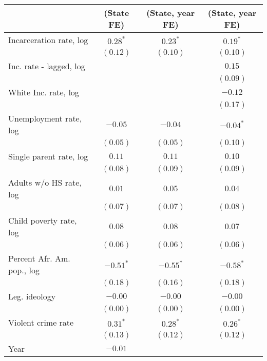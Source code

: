 
\begin{table}
\begin{center}
\label{CL-AfrAm}
\begin{tabular}{l c c c}
\hline
&(State FE)&(State, year FE)&(State, year FE)\\
\hline
Incarceration rate, log     & $0.28^{*}$  &$0.23^{*}$      &$0.19^{*}$ \\
                            & $(0.12)$    & $(0.10)$       &$(0.10)$\\
Inc. rate - lagged, log     &             &                &$0.15$\\
                            &             &                &$(0.09)$\\
White Inc. rate, log        &             &                &$-0.12$\\
                            &             &                &$(0.17)$\\
Unemployment rate, log      & $-0.05$     &$-0.04$     &$-0.04^{*}$\\
                            & $(0.05)$    & $(0.05)$       &$(0.10)$\\
Single parent rate, log     & $0.11$      & $0.11$         &$0.10$\\
                            & $(0.08)$    & $(0.09)$       &$(0.09)$\\
Adults w/o HS rate, log     & $0.01$      & $0.05$         &$0.04$\\
                            & $(0.07)$    & $(0.07)$       &$(0.08)$\\
Child poverty rate, log     & $0.08$      &  $0.08$       &$0.07$\\
                            & $(0.06)$    &  $(0.06)$        &$(0.06)$\\
Percent Afr. Am. pop., log  & $-0.51^{*}$ & $-0.55^{*}$         &$-0.58^{*}$\\
                            & $(0.18)$    & $(0.16)$       &$(0.18)$\\
Leg. ideology               & $-0.00$     & $-0.00$        &$-0.00$\\
                            & $(0.00)$    & $(0.00)$       &$(0.00)$\\
Violent crime rate          & $0.31^{*}$  & $0.28^{*}$         &$0.26^{*}$\\
                            & $(0.13)$    & $(0.12)$       &$(0.12)$\\
Year                        & $-0.01$     &                & \\

\end{tabular}
\end{center}
\end{table}
